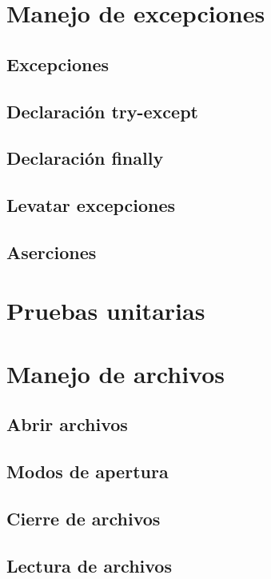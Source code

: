 \documentclass{article}
\begin{document}
\section{Manejo de excepciones}

\subsection{Excepciones}

\subsection{Declaración try-except}

\subsection{Declaración finally}

\subsection{Levatar excepciones}

\subsection{Aserciones}

\section{Pruebas unitarias}

\section{Manejo de archivos}

\subsection{Abrir archivos}

\subsection{Modos de apertura}

\subsection{Cierre de archivos}

\subsection{Lectura de archivos}
\end{document}
